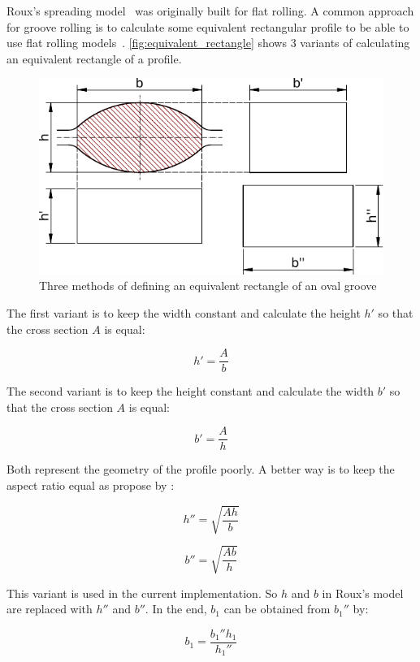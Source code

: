\documentclass[11pt]{PyRollDocs}
\begin{document}
    Roux's spreading model~\cite{Roux1939} was originally built for flat rolling.
    A common approach for groove rolling is to calculate some equivalent rectangular profile to be able to use flat rolling models~\cite{Hensel1978, Spittel1984}.
    \autoref{fig:equivalent_rectangle} shows 3 variants of calculating an equivalent rectangle of a profile.

    \begin{figure}
        \centering
        \includegraphics[width=\linewidth]{equivalent_rectangle}
        \caption{Three methods of defining an equivalent rectangle of an oval groove}
        \label{fig:equivalent_rectangle}
    \end{figure}

    The first variant is to keep the width constant and calculate the height $h'$ so that the cross section $A$ is
    equal:

    \[
        h' = \frac{A}{b}
    \]

    The second variant is to keep the height constant and calculate the width $b'$ so that the cross section $A$ is
    equal:

    \[
        b' = \frac{A}{h}
    \]

    Both represent the geometry of the profile poorly.
    A better way is to keep the aspect ratio equal as propose by \textcite{Spittel1984}:

    \[
        h'' = \sqrt{\frac{A h}{b}}
    \]

    \[
        b'' = \sqrt{\frac{A b}{h}}
    \]

    This variant is used in the current implementation.
    So $h$ and $b$ in Roux's model are replaced with $h''$ and $b''$.
    In the end, $b_1$ can be obtained from $b_1''$ by:

    \[
        b_1 = \frac{b_1'' h_1}{h_1''}
    \]
\end{document}
